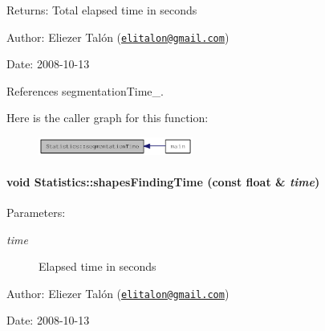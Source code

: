 \begin{Desc}
\item[Returns:]Total elapsed time in seconds\end{Desc}
\begin{Desc}
\item[Author:]Eliezer Talón (\href{mailto:elitalon@gmail.com}{\tt elitalon@gmail.com}) \end{Desc}
\begin{Desc}
\item[Date:]2008-10-13 \end{Desc}


References segmentationTime\_\-.

Here is the caller graph for this function:\nopagebreak
\begin{figure}[H]
\begin{center}
\leavevmode
\includegraphics[width=144pt]{class_statistics_4cea19c3705fc315ce2b4300b3725ab8_icgraph}
\end{center}
\end{figure}
\hypertarget{class_statistics_e380b6d86bb2feeaabba147f731aac73}{
\paragraph[{shapesFindingTime}]{\setlength{\rightskip}{0pt plus 5cm}void Statistics::shapesFindingTime (const float \& {\em time})}\hfill}
\label{class_statistics_e380b6d86bb2feeaabba147f731aac73}


\begin{Desc}
\item[Parameters:]
\begin{description}
\item[{\em time}]Elapsed time in seconds\end{description}
\end{Desc}
\begin{Desc}
\item[Author:]Eliezer Talón (\href{mailto:elitalon@gmail.com}{\tt elitalon@gmail.com}) \end{Desc}
\begin{Desc}
\item[Date:]2008-10-13 \end{Desc}


